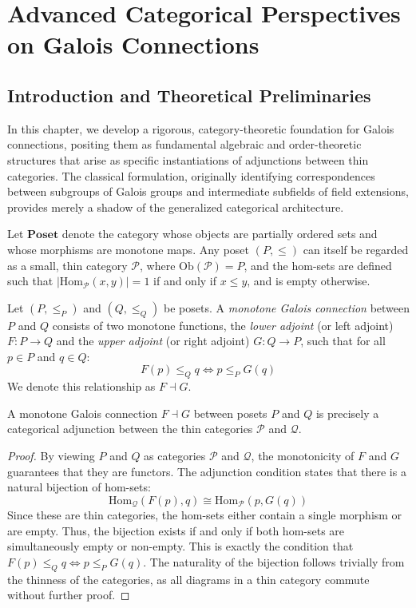 \chapter{Advanced Categorical Perspectives on Galois Connections}
\label{ch:galois_connections}

\section{Introduction and Theoretical Preliminaries}
In this chapter, we develop a rigorous, category-theoretic foundation for Galois connections, positing them as fundamental algebraic and order-theoretic structures that arise as specific instantiations of adjunctions between thin categories. The classical formulation, originally identifying correspondences between subgroups of Galois groups and intermediate subfields of field extensions, provides merely a shadow of the generalized categorical architecture.

Let $\mathbf{Poset}$ denote the category whose objects are partially ordered sets and whose morphisms are monotone maps. Any poset $(P, \leq)$ can itself be regarded as a small, thin category $\mathcal{P}$, where $\text{Ob}(\mathcal{P}) = P$, and the hom-sets are defined such that $|\text{Hom}_{\mathcal{P}}(x, y)| = 1$ if and only if $x \leq y$, and is empty otherwise.

\begin{definition}
Let $(P, \leq_P)$ and $(Q, \leq_Q)$ be posets. A \emph{monotone Galois connection} between $P$ and $Q$ consists of two monotone functions, the \emph{lower adjoint} (or left adjoint) $F: P \to Q$ and the \emph{upper adjoint} (or right adjoint) $G: Q \to P$, such that for all $p \in P$ and $q \in Q$:
\begin{equation}
    F(p) \leq_Q q \iff p \leq_P G(q)
\end{equation}
We denote this relationship as $F \dashv G$.
\end{definition}

\begin{lemma}\label{lem:adjunction_thin}
A monotone Galois connection $F \dashv G$ between posets $P$ and $Q$ is precisely a categorical adjunction between the thin categories $\mathcal{P}$ and $\mathcal{Q}$.
\end{lemma}
\begin{proof}
By viewing $P$ and $Q$ as categories $\mathcal{P}$ and $\mathcal{Q}$, the monotonicity of $F$ and $G$ guarantees that they are functors. The adjunction condition states that there is a natural bijection of hom-sets:
\[ \text{Hom}_{\mathcal{Q}}(F(p), q) \cong \text{Hom}_{\mathcal{P}}(p, G(q)) \]
Since these are thin categories, the hom-sets either contain a single morphism or are empty. Thus, the bijection exists if and only if both hom-sets are simultaneously empty or non-empty. This is exactly the condition that $F(p) \leq_Q q \iff p \leq_P G(q)$. The naturality of the bijection follows trivially from the thinness of the categories, as all diagrams in a thin category commute without further proof.
\end{proof}


